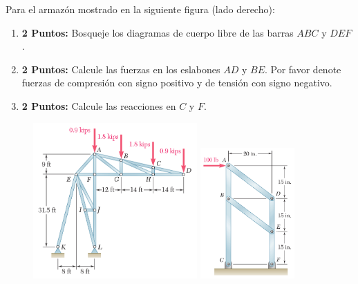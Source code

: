 \documentclass[ a4paper, twoside, 11pt]{article}
\begin{document}
\begin{problem}
Para el armaz\'on mostrado en la siguiente figura (lado derecho):
\begin{enumerate}[label=\textbf{\alph*)}]
\item \textbf{2 Puntos:} Bosqueje los diagramas de cuerpo libre de las barras $ABC$ y $DEF$. 
\item \textbf{2 Puntos:} Calcule las fuerzas en los eslabones $AD$ y $BE$. Por favor denote fuerzas de compresi\'on con signo positivo y de tensi\'on con signo negativo. 
\item \textbf{2 Puntos:} Calcule las reacciones en $C$ y $F$. 
\end{enumerate}

\begin{figure}[htb]
\centering
\includegraphics[width=0.56\textwidth]{prob-armadura.jpg} \qquad
\includegraphics[width=0.32\textwidth]{prob-armazon.jpg}
\end{figure}

\end{problem}
\fullskip
\end{document}
